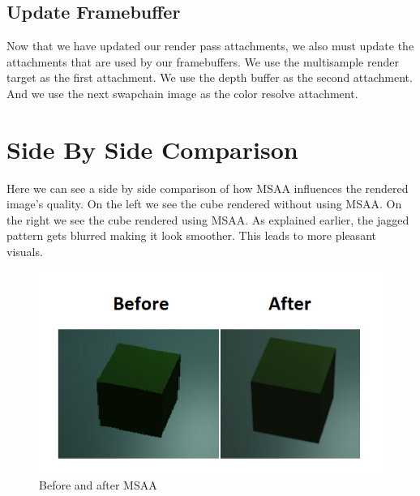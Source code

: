 \begin{minipage}{\linewidth}{\noindent}
    
\end{minipage}

\subsection{Update Framebuffer}

Now that we have updated our render pass attachments, we also must update
the attachments that are used by our framebuffers.
We use the multisample render target as the first attachment.
We use the depth buffer as the second attachment.
And we use the next swapchain image as the color resolve attachment.

\section{Side By Side Comparison}

Here we can see a side by side comparison of how MSAA influences the
rendered image's quality.
On the left we see the cube rendered without using MSAA.
On the right we see the cube rendered using MSAA.
As explained earlier, the jagged pattern gets blurred making it look
smoother.
This leads to more pleasant visuals.

\begin{figure}[H]
    \centering
    \includegraphics[scale=0.40]{images/ChMSAA/BeforeAfterMSAA.png}
    \caption{Before and after MSAA}
    \label{fig::MSAASideBySide}
\end{figure}
